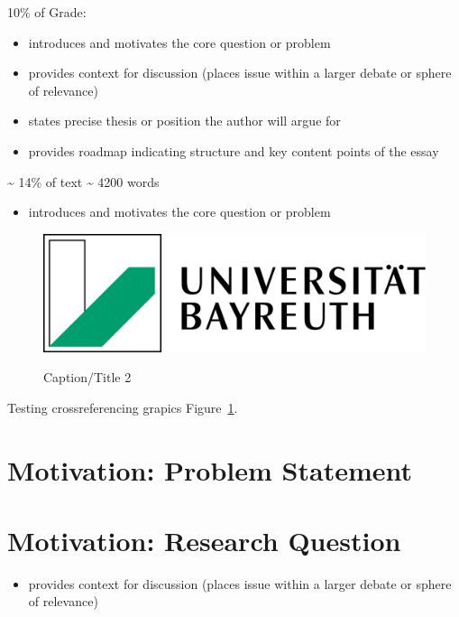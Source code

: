 \documentclass[
  letterpaper,
]{book}
\providecommand{\tightlist}{%
  \setlength{\itemsep}{0pt}\setlength{\parskip}{0pt}}
\begin{document}
10\% of Grade:

\begin{itemize}
\tightlist
\item
  introduces and motivates the core question or problem
\item
  provides context for discussion (places issue within a larger debate
  or sphere of relevance)
\item
  states precise thesis or position the author will argue for
\item
  provides roadmap indicating structure and key content points of the
  essay
\end{itemize}

\textasciitilde{} 14\% of text \textasciitilde{} 4200 words

\begin{itemize}
\tightlist
\item
  introduces and motivates the core question or problem
\end{itemize}

\begin{figure}

\href{https://vjmeyer.com}{\includegraphics[width=0.3\linewidth,height=\textheight,keepaspectratio]{images/cover.png}}

\caption[Short 2 caption]{\label{fig-testgraphic2}Caption/Title 2}

\end{figure}%

Testing crossreferencing grapics Figure~\ref{fig-testgraphic2}.

\section{Motivation: Problem
Statement}\label{motivation-problem-statement}

\section{Motivation: Research
Question}\label{motivation-research-question}

\begin{itemize}
\tightlist
\item
  provides context for discussion (places issue within a larger debate
  or sphere of relevance)
\end{itemize}
\end{document}

